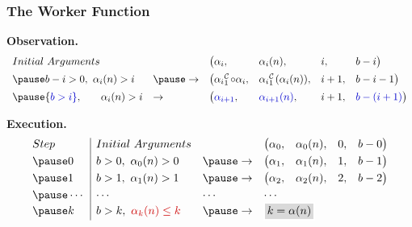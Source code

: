\begin{frame}
\frametitle{The Worker Function}

\pause
\textbf{Observation.}
\begin{equation*}
\begin{array}{lllllll}
Initial \ Arguments & & \big(\alpha_i, & \alpha_i(n), & i, & b - i \big) \\[5pt]
\pause
b - i > 0, \ \alpha_i(n) > i & \pause \to & \big(\cdt{\alpha_i}{1}\circ \alpha_i, & \cdt{\alpha_i}{1}(\alpha_i(n)), & i + 1, & b - i - 1\big) \\[5pt]
\pause
{\color{blue} b > i}, \ \hspace{15pt} \alpha_i(n) > i & \to  & \big({\color{blue} \alpha_{i+1}}, & {\color{blue} \alpha_{i+1}(n)}, & i + 1, & {\color{blue} b - (i + 1)}\big) \\
\end{array}
\end{equation*}

\pause
\textbf{Execution.}
\begin{equation*}
\begin{array}{l|lllllll}
Step & Initial \ Arguments &  &  \big(\alpha_0, & \alpha_0(n), & 0, & b - 0 \big) \\[3pt]
\pause
0 & b > 0, \ \alpha_0(n) > 0 & \pause \to & \big(\alpha_1, & \alpha_1(n), & 1, & b - 1\big) \\[3pt]
\pause
1 & b > 1, \ \alpha_1(n) > 1 & \pause \to  & \big(\alpha_2, & \alpha_2(n), & 2, & b - 2\big) \\[3pt]
\pause
\cdots & \cdots & \cdots & \multicolumn{4}{l}{\cdots} \\
\pause
k & b > k, \ {\color{red} \alpha_{k}(n) \le k} & \pause \to  & \multicolumn{4}{l}{\impinline{$k = \alpha(n)$}}
\end{array}
\end{equation*}
\end{frame}



